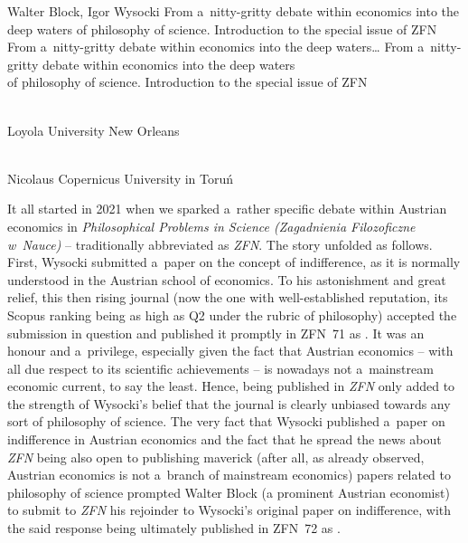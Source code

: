\begin{editorialeng2auth}{Walter Block, Igor Wysocki}
	{From a~nitty-gritty debate within economics into the deep waters of philosophy of science.
	Introduction to the special issue of ZFN}
	{From a~nitty-gritty debate within economics into the deep waters\ldots}
	{From a~nitty-gritty debate within economics into the deep waters\\of philosophy of science.
	Introduction to the special issue of ZFN}
	{%
			{\flushright{}\\\subsubsectit\small{Loyola University New Orleans}\par}%
			{\flushright{}\\\subsubsectit\small{Nicolaus Copernicus University in Toruń}\par}%
	}









It all started in 2021 when we sparked a~rather specific debate within Austrian economics in \textit{Philosophical Problems in Science (Zagadnienia Filozoficzne w~Nauce)} – traditionally abbreviated as \textit{ZFN}. The story unfolded as follows. First, Wysocki submitted a~paper on the concept of indifference, as it is normally understood in the Austrian school of economics. To his astonishment and great relief, this then rising journal (now the one with well-established reputation, its Scopus ranking being as high as Q2 under the rubric of philosophy) accepted the submission in question and published it promptly in ZFN~71
as 
\parencite[][]{wysocki_problem_2021}. %
 It was an honour and a~privilege, especially given the fact that Austrian economics -- with all due respect to its scientific achievements -- is nowadays not a~mainstream economic current, to say the least. Hence, being published in \textit{ZFN} only added to the strength of Wysocki's belief that the journal is clearly unbiased towards any sort of philosophy of science. The very fact that Wysocki published a~paper on indifference in Austrian economics and the fact that he spread the news about \textit{ZFN} being also open to publishing maverick (after all, as already observed, Austrian economics is not a~branch of mainstream economics) papers related to philosophy of science prompted Walter Block (a prominent Austrian economist) to submit to \textit{ZFN} his rejoinder to Wysocki's original paper on indifference, with the said response being ultimately published in ZFN~72
 as 
\parencite[][]{block_response_2022}.%





\end{editorialeng2auth}
